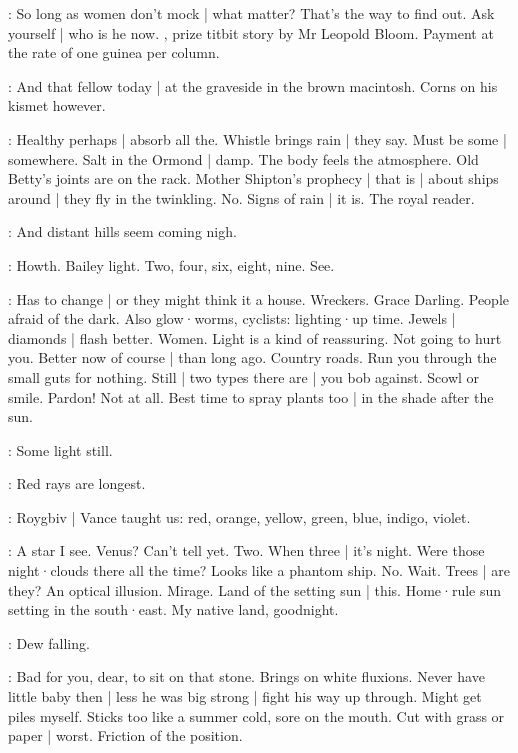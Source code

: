 \BloomAbstract:
So long as women don't mock |
what matter?
That's the way to find out.
Ask yourself |
who is he now.
,%
prize titbit story
by Mr Leopold Bloom.
Payment at the rate of one guinea per column.

\BloomToday:
And that fellow today |
at the graveside in the brown macintosh.
Corns on his kismet however.

\BloomAbstract:
Healthy perhaps |
absorb all the.
Whistle brings rain |
they say.
Must be some |
somewhere.
Salt in the Ormond |
damp.
The body feels the atmosphere.
Old Betty's joints are on the rack.
Mother Shipton's prophecy |
that is |
about ships around |
they fly in the twinkling.
No.
Signs of rain |
it is.
The royal reader.

\BloomCurrent:
And distant hills seem coming nigh.

\BloomCurrent:
Howth.
Bailey light.
Two,
four,
six,
eight,
nine.
See.

\BloomAbstract:
Has to change |
or they might think it a house.
Wreckers.
Grace Darling.
People afraid of the dark.
Also glow·worms,
cyclists:
lighting·up time.%
Jewels |
diamonds |
flash better.
Women.
Light is a kind of reassuring.
Not going to hurt you.
Better now of course |
than long ago.
Country roads.
Run you through the small guts for nothing.
Still |
two types there are |
you bob against.
Scowl or smile.
Pardon!
Not at all.
Best time to spray plants too |
in the shade after the sun.

\BloomCurrent:
Some light still.

\BloomAbstract:
Red rays are longest.

\BloomHist:
Roygbiv |
Vance taught us:
red,
orange,
yellow,
green,
blue,
indigo,
violet.

\BloomCurrent:
A star
I see.
Venus?
Can't tell yet.
Two.
When three |
it's night.
Were those night·clouds there all the time?
Looks like a phantom ship.
No.
Wait.
Trees |
are they?
An optical illusion.
Mirage.
Land of the setting sun |
this.
Home·rule sun setting in the south·east.
My native land,%
goodnight.

\BloomCurrent:
Dew falling.

\BloomAbstract:
Bad for you,
dear,
to sit on that stone.
Brings on white fluxions.
Never have little baby then |
less he was big strong |
fight his way up through.
Might get piles myself.
Sticks too like a summer cold,
sore on the mouth.
Cut with grass or paper |
worst.
Friction of the position.

